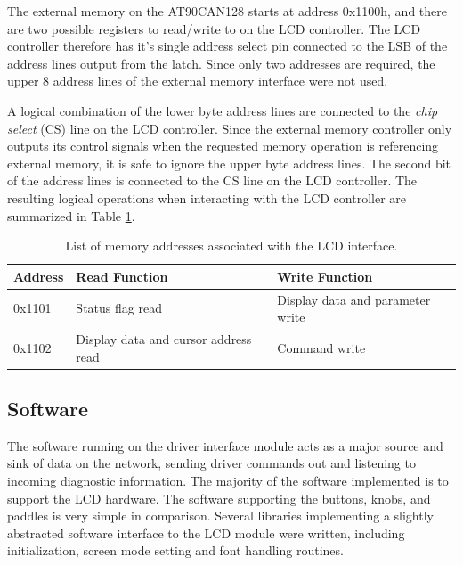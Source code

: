 
The external memory on the AT90CAN128 starts at address 0x1100h, and there are two possible registers to read/write to on the LCD controller. The LCD controller therefore has it's single address select pin connected to the LSB of the address lines output from the latch. Since only two addresses are required, the upper 8 address lines of the external memory interface were not used.


A logical combination of the lower byte address lines are connected to the \emph{chip select} (CS) line on the LCD controller. Since the external memory controller only outputs its control signals when the requested memory operation is referencing external memory, it is safe to ignore the upper byte address lines. The second bit of the address lines is connected to the CS line on the LCD controller. The resulting logical operations when interacting with the LCD controller are summarized in Table \ref{tab:lcd_memory_map}.

\begin{table}[H]
\caption{List of memory addresses associated with the LCD interface.}
\centering{}
\begin{tabular}{|l|l|l|}
\hline 
Address  & Read Function  & Write Function\tabularnewline
\hline
\hline 
0x1101  & Status flag read  & Display data and parameter write\tabularnewline
\hline 
0x1102  & Display data and cursor address read  & Command write\tabularnewline
\hline
\end{tabular}
\label{tab:lcd_memory_map}
\end{table}

\subsection{Software}

The software running on the driver interface module acts as a major source and sink of data on the network, sending driver commands out and listening to incoming diagnostic information. The majority of the software implemented is to support the LCD hardware. The software supporting the buttons, knobs, and paddles is very simple in comparison. Several libraries implementing a slightly abstracted software interface to the LCD module were written, including initialization, screen mode setting and font handling routines.

